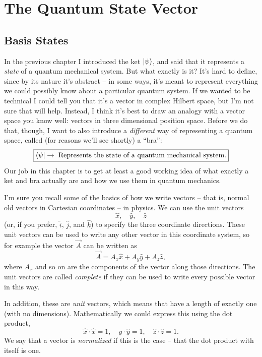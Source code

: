 \chapter{The Quantum State Vector}

\section{Basis States}

In the previous chapter I introduced the ket $| \psi \rangle$, and said that it represents a \emph{state} of a quantum mechanical system.  But what exactly is it?  It's hard to define, since by its nature it's abstract -- in some ways, it's meant to represent everything we could possibly know about a particular quantum system.  If we wanted to be technical I could tell you that it's a vector in complex Hilbert space, but I'm not sure that will help. Instead, I think it's best to draw an analogy with a vector space you know well:  vectors in three dimensional position space.  Before we do that, though, I want to also introduce a \emph{different} way of representing a quantum space, called (for reasons we'll see shortly) a ``bra'':
\begin{equation}
\label{eq_bra_definition}
\boxed{
\langle \psi | \rightarrow \text{ Represents the state of a quantum mechanical system.}
}
\end{equation}
Our job in this chapter is to get at least a good working idea of what exactly a ket and bra actually are and how we use them in quantum mechanics.

I'm sure you recall some of the basics of how we write vectors -- that is, normal old vectors in Cartesian coordinates -- in physics.  We can use the unit vectors
\[
\hat{x}, \quad \hat{y}, \quad \hat{z}
\]
(or, if you prefer, $\hat{i}$, $\hat{j}$, and $\hat{k}$) to specify the three coordinate directions.  These unit vectors can be used to write any other vector in this coordinate system, so for example the vector $\vec{A}$ can be written as
\[
\vec{A} = A_x \hat{x} + A_y \hat{y} + A_z \hat{z},
\]
where $A_x$ and so on are the components of the vector along those directions.  The unit vectors are called \emph{complete} if they can be used to write every possible vector in this way.

In addition, these are \emph{unit} vectors, which means that have a length of exactly one (with no dimensions).  Mathematically we could express this using the dot product,
\[
\hat{x} \cdot \hat{x} = 1, \quad \hat{y} \cdot \hat{y} = 1, \quad \hat{z} \cdot \hat{z} = 1.
\]
We say that a vector is \emph{normalized} if this is the case -- that the dot product with itself is one.

